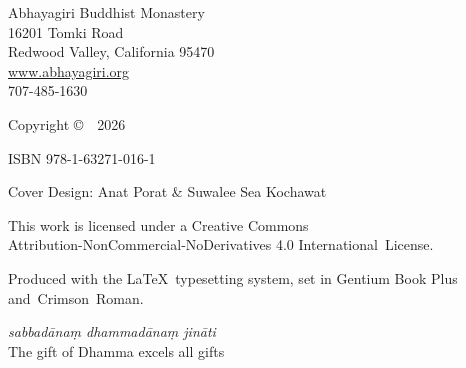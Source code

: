 
\cleartoverso
\thispagestyle{copyright}

{\copyrightsize
\centering
\setlength{\parindent}{0pt}%
\setlength{\parskip}{0.8\baselineskip}%


Abhayagiri Buddhist Monastery\\
16201 Tomki Road\\
Redwood Valley, California 95470\\
\href{http://www.abhayagiri.org}{www.abhayagiri.org}\\
707-485-1630

\vspace{1\baselineskip}

Copyright \copyright\ \thePublisher\ 2026

ISBN 978-1-63271-016-1

Cover Design: Anat Porat \& Suwalee Sea Kochawat

\vfill

{\footnotesize

This work is licensed under a Creative Commons\\
Attribution-NonCommercial-NoDerivatives 4.0 International~License.


Produced with the \LaTeX\ typesetting system, set in Gentium Book Plus \mbox{and Crimson Roman.}

\theEditionInfo

\vspace{1\baselineskip}

\emph{sabbadānaṃ dhammadānaṃ jināti}\\
The gift of Dhamma excels all gifts

}}